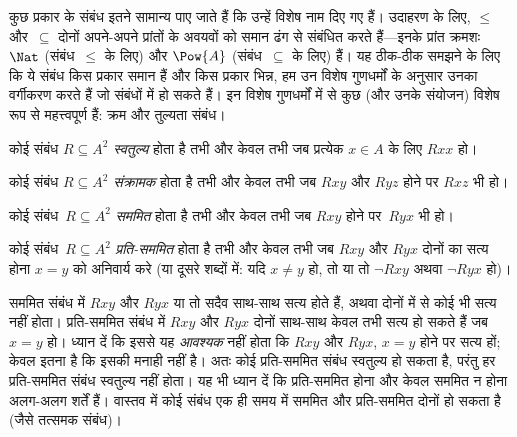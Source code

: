 \documentclass[../../../include/open-logic-section]{subfiles}
\begin{document}

\begin{intro}
कुछ प्रकार के संबंध इतने सामान्य पाए जाते हैं कि उन्हें विशेष नाम दिए गए हैं।
उदाहरण के लिए, $\le$ और~$\subseteq$ दोनों अपने-अपने प्रांतों के अवयवों को
समान ढंग से संबंधित करते हैं---इनके प्रांत क्रमशः $\Nat$ (संबंध~$\le$ के
लिए) और $\Pow{A}$ (संबंध~$\subseteq$ के लिए) हैं। यह ठीक-ठीक समझने के लिए कि ये संबंध किस प्रकार
समान हैं और किस प्रकार भिन्न, हम उन विशेष गुणधर्मों के अनुसार उनका वर्गीकरण
करते हैं जो संबंधों में हो सकते हैं। इन विशेष गुणधर्मों में से कुछ (और उनके
संयोजन) विशेष रूप से महत्त्वपूर्ण हैं: क्रम और तुल्यता संबंध।
\end{intro}

\begin{defn}[स्वतुल्यता]
कोई संबंध $R \subseteq A^2$ \emph{स्वतुल्य} होता है तभी और केवल तभी जब
प्रत्येक $x \in
A$ के लिए $Rxx$ हो।
\end{defn}

\begin{defn}[संक्रामकता]
कोई संबंध $R \subseteq A^2$ \emph{संक्रामक} होता है तभी और केवल तभी जब
$Rxy$ और $Ryz$ होने पर $Rxz$ भी हो।
\end{defn}

\begin{defn}[सममिति]
कोई संबंध~$R \subseteq A^2$ \emph{सममित} होता है तभी और केवल तभी जब
$Rxy$ होने पर~$Ryx$ भी हो।
\end{defn}

\begin{defn}[प्रति-सममिति]
कोई संबंध~$R \subseteq A^2$ \emph{प्रति-सममित} होता है तभी और केवल तभी जब
$Rxy$ और $Ryx$ दोनों का सत्य होना $x=y$ को अनिवार्य करे (या दूसरे शब्दों में: यदि $x\neq y$
हो, तो या तो $\lnot Rxy$ अथवा $\lnot Ryx$ हो)।
\end{defn}

\begin{explain}
सममित संबंध में $Rxy$ और $Ryx$ या तो सदैव साथ-साथ सत्य होते हैं, अथवा
दोनों में से कोई भी सत्य नहीं होता। प्रति-सममित संबंध में $Rxy$ और $Ryx$
दोनों साथ-साथ केवल तभी सत्य हो सकते हैं जब $x = y$ हो। ध्यान दें कि इससे यह
\emph{आवश्यक} नहीं होता कि $Rxy$ और $Ryx$, $x = y$ होने पर सत्य हों; केवल इतना है
कि इसकी मनाही नहीं है। अतः कोई प्रति-सममित संबंध स्वतुल्य हो सकता है, परंतु
हर प्रति-सममित संबंध स्वतुल्य नहीं होता। यह भी ध्यान दें कि प्रति-सममित
होना और केवल सममित न होना अलग-अलग शर्तें हैं। वास्तव में कोई संबंध एक ही
समय में सममित और प्रति-सममित दोनों हो सकता है (जैसे तत्समक संबंध)।
\end{explain}
\end{document}

